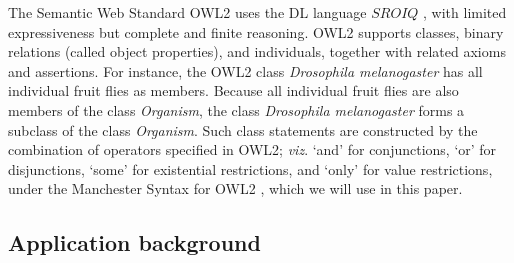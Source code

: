 The Semantic Web Standard OWL2 \citep{W3C2012} uses the DL language $SROIQ$ \citep{Horrocks2006}, with limited expressiveness but complete and finite reasoning. OWL2 supports classes, binary relations (called object properties), and individuals, together with related axioms and assertions. For instance, the OWL2 class \textit{Drosophila melanogaster} has all individual fruit flies as members. Because all individual fruit flies are also members of the class \textit{Organism}, the class  \textit{Drosophila melanogaster} forms a subclass of the class \textit{Organism}. 
Such class statements are constructed  by the combination  of operators specified in OWL2; \emph{viz}. `and' for conjunctions, `or' for disjunctions, `some' for existential restrictions, and `only' for value restrictions, under the Manchester Syntax for OWL2 \citep{Horridge2009}, which we will use in this paper. 



%
%

\subsection{Application background}

